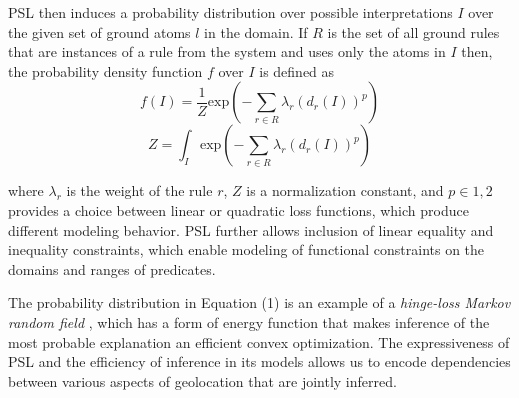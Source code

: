 PSL then induces a probability distribution over possible interpretations $\mathit{I}$ over the given set of ground atoms $\mathit{l} $ in the domain. 
If $\mathit{R}$ is the set of all ground rules that are instances of a rule from the system and uses only the atoms in  $\mathit{I}$ then,
the probability density function $\mathit{f}$ over $\mathit{I}$ is defined as
\begin{equation}
\label{eq:contimn1}
    f (I) = \frac{1}{Z} \text{exp}(-\sum_{r\in R} \lambda_r (d_r(I))^p)
\end{equation}
\begin{equation}
\label{eq:contimn2}
	Z = \int_{I} \text{exp} ( -\sum_{r\in R} \lambda_r (d_r(I))^p )
\end{equation}
{\color{red}
where $\lambda_r$ is the weight of the rule $r$, $Z$ is a normalization
constant, and $p \in {1, 2}$ provides a choice between linear or
quadratic loss functions, which produce different modeling behavior. PSL
further allows inclusion of linear equality and inequality constraints,
which enable modeling of functional constraints on the domains and
ranges of predicates. 

The probability distribution in Equation (1) is an example of a
\emph{hinge-loss Markov random field} \cite{bach:uai13}, which has a
form of energy function that makes inference of the most probable
explanation an efficient convex optimization. The expressiveness of PSL
and the efficiency of inference in its models allows us to encode
dependencies between various aspects of geolocation that are jointly
inferred.
}
%

